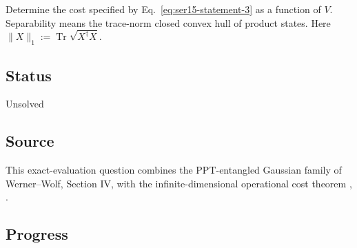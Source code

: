 Determine the cost specified by Eq.~\eqref{eq:ser15-statement-3} as a function of $V$. Separability means the trace-norm closed convex hull of product states. Here $\|X\|_1:=\operatorname{Tr}\sqrt{X^\dagger X}$.

\subsection*{Status}

Unsolved

\subsection*{Source}

This exact-evaluation question combines the PPT-entangled Gaussian family of Werner--Wolf, Section IV, with the infinite-dimensional operational cost theorem , .

\subsection*{Progress}

